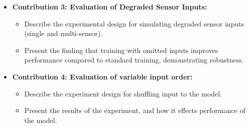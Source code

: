 \begin{itemize}
\begin{itemize}
\begin{itemize}
        \end{itemize}
        \item \textbf{Contribution 3: Evaluation of Degraded Sensor Inputs:}
        \begin{itemize}
            \item Describe the experimental design for simulating degraded sensor inputs (single and multi-sensor).
            \item Present the finding that training with omitted inputs improves performance compared to standard training, demonstrating robustness.
        \end{itemize}
        \item \textbf{Contribution 4: Evaluation of variable input order:}
        \begin{itemize}
            \item Describe the experiment design for shuffling input to the model.
            \item Present the results of the experiment, and how it effects performance of the model.
        \end{itemize}
    \end{itemize}
\end{itemize}


